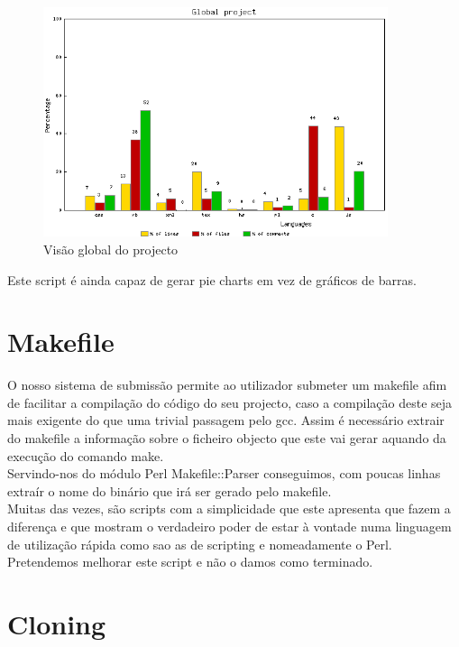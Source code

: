 \begin{figure}[htbp]
\begin{center}
\includegraphics[width=0.9\textwidth]{Images/projecto_projectLanguages.png}
\caption{Visão global do projecto}\label{fig:projectlanguages}
\end{center}
\end{figure}

Este script é ainda capaz de gerar pie charts em vez de gráficos de barras.

\section{Makefile}
O nosso sistema de submissão permite ao utilizador submeter um \textrm{makefile} afim de facilitar a compilação do código do seu projecto, caso a compilação deste seja mais
exigente do que uma trivial passagem pelo \textrm{gcc}. Assim é necessário extrair do \textrm{makefile} a informação sobre o ficheiro objecto que este vai gerar aquando da
execução do comando \textrm{make}.\\
Servindo-nos do módulo \textrm{Perl} \textrm{Makefile::Parser} conseguimos, com poucas linhas extraír o nome do binário que irá ser gerado pelo \textrm{makefile}.\\

Muitas das vezes, são scripts com a simplicidade que este apresenta que fazem a diferença e que mostram o verdadeiro poder de estar à vontade numa linguagem de utilização rápida
como sao as de scripting e nomeadamente o \textrm{Perl}.\\

Pretendemos melhorar este script e não o damos como terminado.
\section{Cloning}

